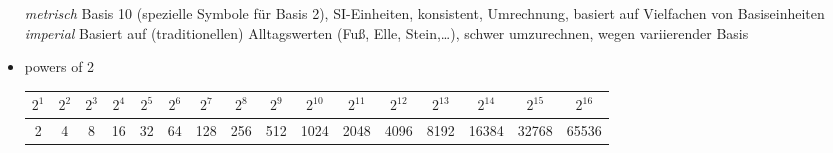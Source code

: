 \begin{itemize}
  \emph{metrisch} Basis 10 (spezielle Symbole für Basis 2), SI-Einheiten, konsistent, Umrechnung, basiert auf Vielfachen von Basiseinheiten\\
  \emph{imperial} Basiert auf (traditionellen) Alltagswerten (Fuß, Elle, Stein,\dots), schwer umzurechnen, wegen variierender Basis
  \item powers of 2 \\
   \begin{tabular}{c|c|c|c|c|c|c|c|c|c|c|c|c|c|c|c}
   $2^1$ & $2^2$ & $2^3$ & $2^4$ & $2^5$ & $2^6$ & $2^7$ & $2^8$ & $2^9$ & $2^{10}$ & $2^{11}$ & $2^{12}$ & $2^{13}$ & $2^{14}$ & $2^{15}$ & $2^{16}$ \\
   \hline 2 & 4 & 8 & 16 & 32 & 64 & 128 & 256 & 512 & 1024 & 2048 & 4096 & 8192 & 16384 & 32768 & 65536
   \end{tabular}
 \end{itemize}


